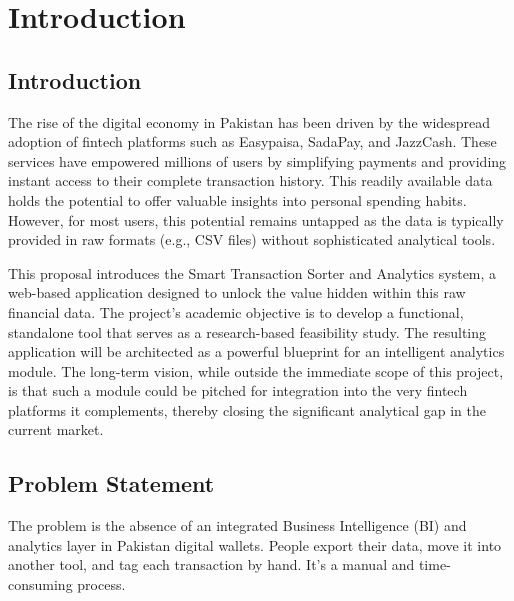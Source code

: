 \documentclass[11pt,a4paper]{report}
\begin{document}
	
	
	
	
	
	\tableofcontents
	\newpage
	\listoffigures
	\newpage
\chapter{Introduction}

\section{Introduction}
The rise of the digital economy in Pakistan has been driven by the widespread adoption of fintech platforms such as Easypaisa, SadaPay, and JazzCash. These services have empowered millions of users by simplifying payments and providing instant access to their complete transaction history. This readily available data holds the potential to offer valuable insights into personal spending habits. However, for most users, this potential remains untapped as the data is typically provided in raw formats (e.g., CSV files) without sophisticated analytical tools.

This proposal introduces the Smart Transaction Sorter and Analytics system, a web-based application designed to unlock the value hidden within this raw financial data. The project's academic objective is to develop a functional, standalone tool that serves as a research-based feasibility study. The resulting application will be architected as a powerful blueprint for an intelligent analytics module. The long-term vision, while outside the immediate scope of this project, is that such a module could be pitched for integration into the very fintech platforms it complements, thereby closing the significant analytical gap in the current market.

\section{Problem Statement}
The problem is the absence of an integrated Business Intelligence (BI) and analytics layer in Pakistan digital wallets. People export their data, move it into another tool, and tag each transaction by hand. It’s a manual and time-consuming process.
\end{document}
